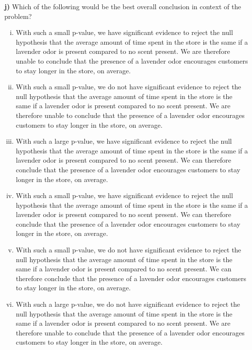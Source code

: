 \documentclass[12pt, oneside]{article}
\newcommand{\noi}{\noindent}
\begin{document}
\noi
{\bf j)} Which of the following would be the best overall conclusion in context of the problem?
\begin{enumerate}[(i)] 
\item With such a small p-value, we have significant evidence to reject the null hypothesis that the average amount of time spent in the store is the same if a lavender odor is present compared to no scent present. We are therefore unable to conclude that the presence of a lavender odor encourages customers to stay longer in the store, on average.
\item With such a small p-value, we do not have significant evidence to reject the null hypothesis that the average amount of time spent in the store is the same if a lavender odor is present compared to no scent present. We are therefore unable to conclude that the presence of a lavender odor encourages customers to stay longer in the store, on average.
\item With such a large p-value, we have significant evidence to reject the null hypothesis that the average amount of time spent in the store is the same if a lavender odor is present compared to no scent present. We can therefore conclude that the presence of a lavender odor encourages customers to stay longer in the store, on average.
\item With such a small p-value, we have significant evidence to reject the null hypothesis that the average amount of time spent in the store is the same if a lavender odor is present compared to no scent present. We can therefore conclude that the presence of a lavender odor encourages customers to stay longer in the store, on average.
\item With such a small p-value, we do not have significant evidence to reject the null hypothesis that the average amount of time spent in the store is the same if a lavender odor is present compared to no scent present. We can therefore conclude that the presence of a lavender odor encourages customers to stay longer in the store, on average.
\item With such a large p-value, we do not have significant evidence to reject the null hypothesis that the average amount of time spent in the store is the same if a lavender odor is present compared to no scent present. We are therefore unable to conclude that the presence of a lavender odor encourages customers to stay longer in the store, on average.
\end{enumerate}
\vspace{.2in}
\end{document}
